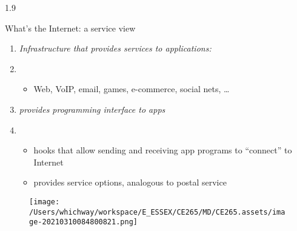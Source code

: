\documentclass[
]{article}
\begin{document}
1.9

What's the Internet: a service view

\begin{enumerate}
\def\labelenumi{\arabic{enumi}.}
\item
  \emph{Infrastructure that provides services to applications:}
\item
  \begin{itemize}
  \item
    Web, VoIP, email, games, e-commerce, social nets, \ldots{}
  \end{itemize}
\item
  \emph{provides programming interface to apps}
\item
  \begin{itemize}
  \item
    hooks that allow sending and receiving app programs to ``connect''
    to Internet
  \item
    provides service options, analogous to postal service
  \end{itemize}
\end{enumerate}

\begin{figure}
\centering
\texttt{[image: /Users/whichway/workspace/E\_ESSEX/CE265/MD/CE265.assets/image-20210310084800821.png]}
\caption{}
\end{figure}
\end{document}

